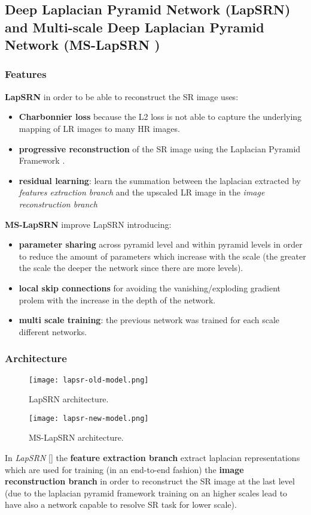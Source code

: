 \subsection{Deep Laplacian Pyramid Network (LapSRN\cite{LapSRN}) and Multi-scale Deep Laplacian Pyramid Network (MS-LapSRN \cite{MSLapSRN})}\label{lapsrn}

\subsubsection{Features}
\textbf{LapSRN} in order to be able to reconstruct the SR image uses:
\begin{itemize}
    \item \textbf{Charbonnier loss} because the L2 loss is not able to capture the underlying mapping of LR images to many HR images.
    \item \textbf{progressive reconstruction} of the SR image using the Laplacian Pyramid 
    Framework \cite{laplacianpyramid}.
    \item \textbf{residual learning}: learn the summation between the laplacian extracted by \textit{features extraction branch} and the upscaled LR image in the \textit{image reconstruction branch}
\end{itemize}
\textbf{MS-LapSRN} improve LapSRN introducing:
\begin{itemize}
    \item \textbf{parameter sharing} across pyramid level and within pyramid levels in order to reduce the amount of parameters which increase with the scale (the greater the scale the deeper the network since there are more levels).
    \item \textbf{local skip connections} for avoiding the vanishing/exploding gradient prolem with the increase in the depth of the network.
    \item \textbf{multi scale training}: the previous network was trained for each scale different networks.
\end{itemize}

\subsubsection{Architecture}
\begin{figure}
    \centering
    \texttt{[image: lapsr-old-model.png]}
    \caption{LapSRN architecture.}\label{lapsrn:old}
\end{figure}

\begin{figure}
    \centering
    \texttt{[image: lapsr-new-model.png]}
    \caption{MS-LapSRN architecture.}\label{lapsrn:new}
\end{figure}
In \textit{LapSRN} [] the \textbf{feature extraction branch} extract laplacian representations which are used for training (in an end-to-end fashion) the \textbf{image reconstruction branch} in order to reconstruct the SR image at the last level (due to the laplacian pyramid framework training on an higher scales lead to have also a network capable to resolve SR task for lower scale).

